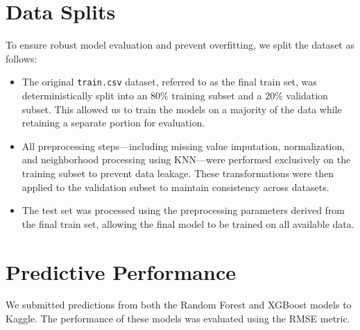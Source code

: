 \documentclass[12pt]{article}
\begin{document}
\section{Data Splits}

To ensure robust model evaluation and prevent overfitting, we split the dataset as follows:

\begin{itemize}
    \item The original \texttt{train.csv} dataset, referred to as the final train set, was deterministically split into an 80\% training subset and a 20\% validation subset. This allowed us to train the models on a majority of the data while retaining a separate portion for evaluation.
    \item All preprocessing steps—including missing value imputation, normalization, and neighborhood processing using KNN—were performed exclusively on the training subset to prevent data leakage. These transformations were then applied to the validation subset to maintain consistency across datasets.
    \item The test set was processed using the preprocessing parameters derived from the final train set, allowing the final model to be trained on all available data.
\end{itemize}

\section{Predictive Performance}

We submitted predictions from both the Random Forest and XGBoost models to Kaggle. The performance of these models was evaluated using the RMSE metric.
\end{document}

